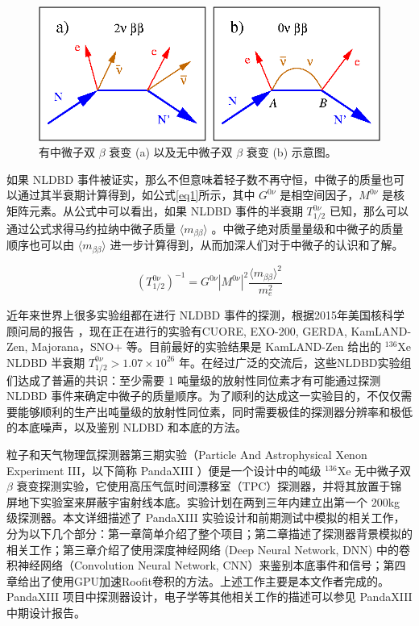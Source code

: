\begin{figure}
    \centering
    \includegraphics[width=0.5\columnwidth]{pic/nldbd.png}
    \caption{有中微子双 $\beta$ 衰变 (a) 以及无中微子双 $\beta$ 衰变 (b) 示意图。}
    \label{fig:nldbd}
\end{figure}

如果 NLDBD 事件被证实，那么不但意味着轻子数不再守恒，中微子的质量也可以通过其半衰期计算得到，如公式\ref{eq1}所示\supercite{avignone2008double}，其中 $G^{0\nu}$ 是相空间因子，$M^{0\nu}$ 是核矩阵元素。从公式中可以看出，如果 NLDBD 事件的半衰期 $T^{0\nu}_{1/2}$ 已知，那么可以通过公式求得马约拉纳中微子质量 $\langle m_{\beta\beta}\rangle$ 。中微子绝对质量量级和中微子的质量顺序也可以由 $\langle m_{\beta\beta}\rangle$ 进一步计算得到，从而加深人们对于中微子的认识和了解。

\begin{equation}
    (T_{1/2}^{0\nu})^{-1}=G^{0\nu}|M^{0\nu}|^2\frac{\langle m_{\beta\beta}\rangle ^2}{m_e^2}
    \label{eq1}
\end{equation}

近年来世界上很多实验组都在进行 NLDBD 事件的探测，根据2015年美国核科学顾问局的报告 \supercite{NLDBD_NSAC}，现在正在进行的实验有CUORE\supercite{Artusa:2014lgv}, EXO-200\supercite{Albert:2014awa}, GERDA\supercite{Agostini:2016iid}, KamLAND-Zen\supercite{KamLAND-Zen:2016pfg}, Majorana\supercite{Abgrall:2013rze}，SNO+\supercite{Andringa:2015tza} 等。目前最好的实验结果是 KamLAND-Zen 给出的 $^{136}$Xe NLDBD 半衰期 $T^{0\nu}_{1/2}>1.07\times10^{26}$ 年。在经过广泛的交流后，这些NLDBD实验组们达成了普遍的共识：至少需要 1 吨量级的放射性同位素才有可能通过探测 NLDBD 事件来确定中微子的质量顺序。为了顺利的达成这一实验目的，不仅仅需要能够顺利的生产出吨量级的放射性同位素，同时需要极佳的探测器分辨率和极低的本底噪声，以及鉴别 NLDBD 
和本底的方法。

粒子和天气物理氙探测器第三期实验（Particle And Astrophysical Xenon Experiment III，以下简称 PandaXIII ）便是一个设计中的吨级 $^{136}$Xe 无中微子双 $\beta$ 衰变探测实验，它使用高压气氙时间漂移室（TPC）探测器，并将其放置于锦屏地下实验室来屏蔽宇宙射线本底。实验计划在两到三年内建立出第一个 200kg 级探测器。本文详细描述了 PandaXIII 实验设计和前期测试中模拟的相关工作，分为以下几个部分：第一章简单介绍了整个项目；第二章描述了探测器背景模拟的相关工作；第三章介绍了使用深度神经网络 (Deep Neural Network, DNN) 中的卷积神经网络（Convolution Neural Network, CNN）来鉴别本底事件和信号；第四章给出了使用GPU加速Roofit卷积的方法。上述工作主要是本文作者完成的。PandaXIII 项目中探测器设计，电子学等其他相关工作的描述可以参见 PandaXIII 中期设计报告\supercite{cdr}。

